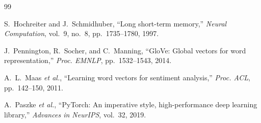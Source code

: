 \documentclass[letterpaper, 10 pt, conference]{ieeeconf}
\begin{document}
\begin{thebibliography}{99}

S.~Hochreiter and J.~Schmidhuber,
``Long short-term memory,''
\textit{Neural Computation}, vol.~9, no.~8, pp.~1735--1780, 1997.

J.~Pennington, R.~Socher, and C.~Manning,
``GloVe: Global vectors for word representation,''
\textit{Proc. EMNLP}, pp.~1532--1543, 2014.

A.~L.~Maas \textit{et al.},
``Learning word vectors for sentiment analysis,''
\textit{Proc. ACL}, pp.~142--150, 2011.

A.~Paszke \textit{et al.},
``PyTorch: An imperative style, high-performance deep learning library,''
\textit{Advances in NeurIPS}, vol.~32, 2019.

\end{thebibliography}
\end{document}

